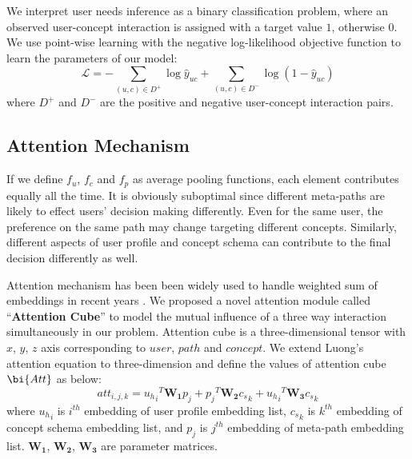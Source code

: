 We interpret user needs inference as a binary classification problem, 
where an observed user-concept interaction is assigned with a target value $1$, otherwise $0$. 
We use point-wise learning with the negative log-likelihood objective function to learn the parameters of our model:
\begin{equation}
\mathscr{L} = -\sum_{(u, c)\in D^+}{\log \hat y_{uc}} + \sum_{(u, c)\in D^-}{\log (1-\hat y_{uc})}
\end{equation}
where $D^+$ and $D^-$ are the positive and negative user-concept interaction pairs.


\subsection{Attention Mechanism}
\label{sec:att}

If we define $f_u$, $f_c$ and $f_p$ as average pooling functions, each element contributes equally all the time.
It is obviously suboptimal since different meta-paths are likely to effect users' decision making differently.
Even for the same user, the preference on the same path may change targeting different concepts.
Similarly, different aspects of user profile and concept schema can contribute to the final decision differently as well.

Attention mechanism has been been widely used to handle weighted sum of embeddings 
in recent years \cite{bahdanau2014neural,yin2016abcnn}.
We proposed a novel attention module called ``\textbf{Attention Cube}'' to 
model the mutual influence of a three way interaction simultaneously in our problem.
Attention cube is a three-dimensional tensor with $x$, $y$, $z$ axis corresponding to $user$, $path$ and $concept$. 
We extend Luong's attention equation \cite{luong2015effective} to three-dimension and define the values of attention cube $\bi{Att}$ as below:
\begin{equation}
\label{eqn:att}
att_{i,j,k} = {{u_h}_i}^T \bm{W_1} p_j + {p_j}^T \bm{W_2} {c_s}_k + {{u_h}_i}^T \bm{W_3} {c_s}_k  
\end{equation}
where ${u_h}_i$ is $i^{th}$ embedding of user profile embedding list,
 ${c_s}_k$ is $k^{th}$ embedding of concept schema embedding list,
 and $p_j$ is $j^{th}$ embedding of meta-path embedding list.
 $\bm{W_1}$,  $\bm{W_2}$,  $\bm{W_3}$ are parameter matrices.
 
